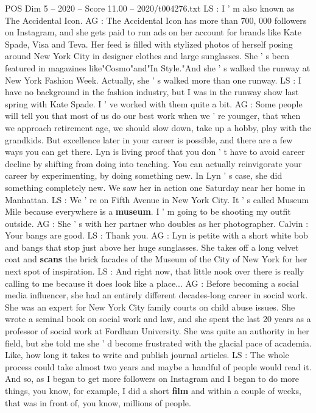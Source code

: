 \begin{textsample}{POS Dim 5 – 2020 – Score 11.00 – 2020/t004276.txt}
LS : I ' m also known as The Accidental Icon.
AG : The Accidental Icon has more than 700, 000 followers on Instagram, and she gets paid to run ads on her account for brands like Kate Spade, Visa and Teva.
Her feed is filled with stylized photos of herself posing around New York City in designer clothes and large sunglasses.
She ' s been featured in magazines like"Cosmo"and"In Style."And she ' s walked the runway at New York Fashion Week.
Actually, she ' s walked more than one runway.
LS : I have no background in the fashion industry, but I was in the runway show last spring with Kate Spade.
I ' ve worked with them quite a bit.
AG : Some people will tell you that most of us do our best work when we ' re younger, that when we approach retirement age, we should slow down, take up a hobby, play with the grandkids.
But excellence later in your career is possible, and there are a few ways you can get there.
Lyn is living proof that you don ' t have to avoid career decline by shifting from doing into teaching.
You can actually reinvigorate your career by experimenting, by doing something new.
In Lyn ' s case, she did something completely new.
We saw her in action one Saturday near her home in Manhattan.
LS : We ' re on Fifth Avenue in New York City.
It ' s called Museum Mile because everywhere is a \textbf{museum}.
I ' m going to be shooting my outfit outside.
AG : She ' s with her partner who doubles as her photographer.
Calvin : Your bangs are good.
LS : Thank you.
AG : Lyn is petite with a short white bob and bangs that stop just above her huge sunglasses.
She takes off a long velvet coat and \textbf{scans} the brick facades of the Museum of the City of New York for her next spot of inspiration.
LS : And right now, that little nook over there is really calling to me because it does look like a place...
AG : Before becoming a social media influencer, she had an entirely different decades-long career in social work.
She was an expert for New York City family courts on child abuse issues.
She wrote a seminal book on social work and law, and she spent the last 20 years as a professor of social work at Fordham University.
She was quite an authority in her field, but she told me she ' d become frustrated with the glacial pace of academia.
Like, how long it takes to write and publish journal articles.
LS : The whole process could take almost two years and maybe a handful of people would read it.
And so, as I began to get more followers on Instagram and I began to do more things, you know, for example, I did a short \textbf{film} and within a couple of weeks, that was in front of, you know, millions of people.

\end{textsample}
